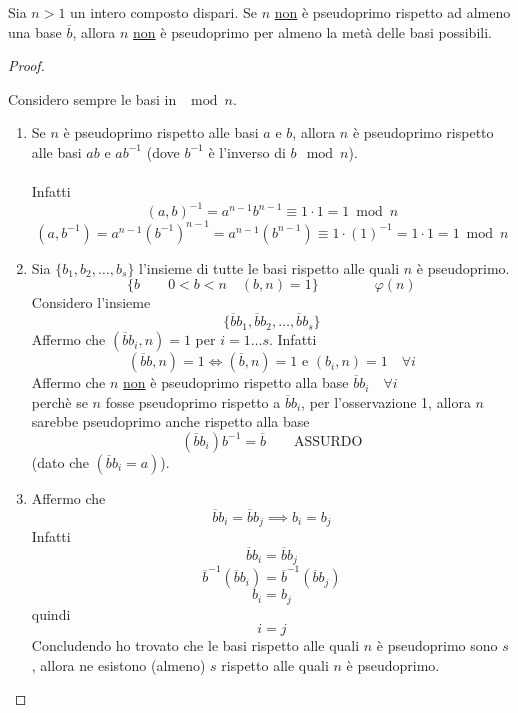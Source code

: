 \documentclass[a4paper,12pt, oneside]{book}
\begin{document}
\begin{teorema}
	Sia $n>1$ un intero composto dispari.
	Se $n$ \underline{non} è pseudoprimo rispetto ad almeno una base $\overline{b}$, allora $n$ \underline{non} è pseudoprimo per almeno la metà delle basi possibili.

	\begin{proof}
		\begin{nota}
			Considero sempre le basi in $\mod n$.
		\end{nota}
		\begin{enumerate}
			\item Se $n$ è pseudoprimo rispetto alle basi $a$ e $b$, allora $n$ è pseudoprimo rispetto alle basi $ab$ e $ab^{-1}$ (dove $b^{-1}$ è l'inverso di $b \mod n$).\\\\
			      Infatti
			      $$(a,b)^{-1} = a^{n-1} b^{n-1} \equiv 1 \cdot 1 = 1 \bmod n$$
			      $$(a,b^{-1}) = a^{n-1} (b^{-1})^{n-1} = a^{n-1} (b^{n-1}) \equiv 1 \cdot (1)^{-1} = 1 \cdot 1 = 1 \bmod n$$

			\item Sia $\{ b_1, b_2, \dots , b_s \}$ l'insieme di tutte le basi rispetto alle quali $n$ è pseudoprimo.
			      $$\{ b \qquad 0<b<n \quad (b,n)=1 \} \qquad\qquad \varphi(n)$$
			      Considero l'insieme $$\{ \overline{b}b_1, \overline{b}b_2, \dots, \overline{b}b_s \}$$
			      Affermo che $(\overline{b}b_i, n) =1$ per $i=1 \dots s$. Infatti
			      $$(\overline{b}b, n)=1 \iff (\overline{b},n) =1 \mbox{ e } (b_i,n)=1 \quad \forall i$$
			      Affermo che $n$ \underline{non} è pseudoprimo rispetto alla base $\overline{b}b_i \quad \forall i$\\
			      perchè se $n$ fosse pseudoprimo rispetto a $\overline{b}b_i$, per l'osservazione 1, allora $n$ sarebbe pseudoprimo anche rispetto alla base
			      $$(\overline{b}b_i) b^{-1} = \overline{b} \qquad \mbox{ASSURDO}$$
			      (dato che $(\overline{b}b_i = a)$).

			\item Affermo che
			      $$\overline{b}b_i = \overline{b}b_j \implies b_i = b_j$$
			      Infatti
			      $$\overline{b}b_i = \overline{b}b_j$$
			      $$\overline{b}^{-1}(\overline{b}b_i) = \overline{b}^{-1}(\overline{b}b_j)$$
			      $$b_i = b_j$$
			      quindi
			      $$i=j$$
			      Concludendo ho trovato che le basi rispetto alle quali $n$ è pseudoprimo sono $s$, allora ne esistono (almeno) $s$ rispetto alle quali $n$ è pseudoprimo.
		\end{enumerate}
	\end{proof}
\end{teorema}
\end{document}
